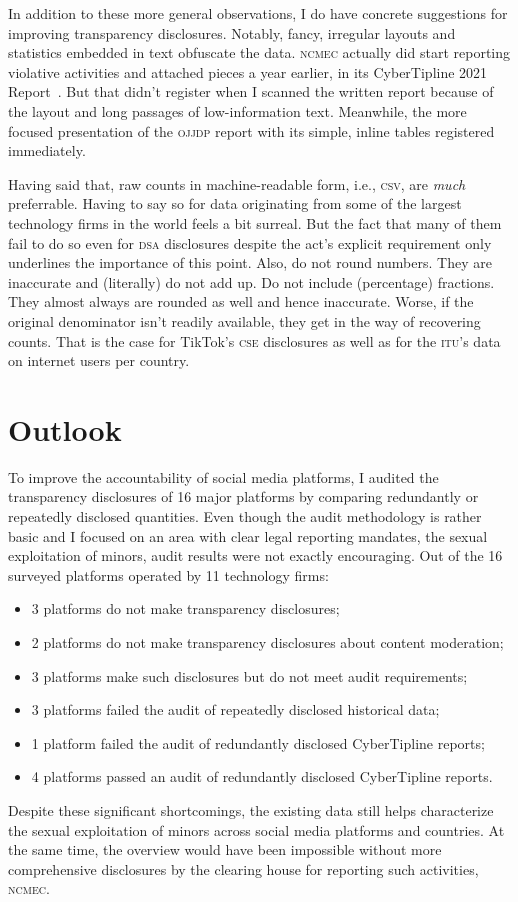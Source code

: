 \documentclass[nonacm,screen]{acmart}
\newcommand\V[1]{\textsc{\MakeLowercase{#1}}}
\begin{document}
In addition to these more general observations, I do have concrete suggestions
for improving transparency disclosures. Notably, fancy, irregular layouts and
statistics embedded in text obfuscate the data. \V{NCMEC} actually did start
reporting violative activities and attached pieces a year earlier, in its
CyberTipline 2021 Report~\cite{NcmecCyberTipline2021}. But that didn't register
when I scanned the written report because of the layout and long passages of
low-information text. Meanwhile, the more focused presentation of the \V{OJJDP}
report with its simple, inline tables registered immediately.

Having said that, raw counts in machine-readable form, i.e., \V{CSV}, are
\emph{much} preferrable. Having to say so for data originating from some of the
largest technology firms in the world feels a bit surreal. But the fact that
many of them fail to do so even for \V{DSA} disclosures despite the act's
explicit requirement only underlines the importance of this point. Also, do not
round numbers. They are inaccurate and (literally) do not add up. Do not include
(percentage) fractions. They almost always are rounded as well and hence
inaccurate. Worse, if the original denominator isn't readily available, they get
in the way of recovering counts. That is the case for TikTok's \V{CSE}
disclosures as well as for the \V{ITU}'s data on internet users per country.


\section{Outlook}
\label{sec:outlook}

To improve the accountability of social media platforms, I audited the
transparency disclosures of 16 major platforms by comparing redundantly or
repeatedly disclosed quantities. Even though the audit methodology is rather
basic and I focused on an area with clear legal reporting mandates, the sexual
exploitation of minors, audit results were not exactly encouraging. Out of the
16 surveyed platforms operated by 11 technology firms:
\begin{itemize}
\item[\ding{56}] 3 platforms do not make transparency disclosures;
\item[\ding{56}] 2 platforms do not make transparency disclosures about content moderation;
\item[\ding{56}] 3 platforms make such disclosures but do not meet audit requirements;
\item[\ding{56}] 3 platforms failed the audit of repeatedly disclosed historical data;
\item[\ding{56}] 1 platform failed the audit of redundantly disclosed CyberTipline reports;
\item[\ding{52}] 4 platforms passed an audit of redundantly disclosed CyberTipline reports.
\end{itemize}
Despite these significant shortcomings, the existing data still helps
characterize the sexual exploitation of minors across social media platforms and
countries. At the same time, the overview would have been impossible without
more comprehensive disclosures by the clearing house for reporting such
activities, \V{NCMEC}.
\end{document}
